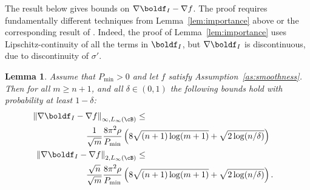 \documentclass[letterpaper, 10 pt, conference]{ieeeconf}  %
\newtheorem{lemma}{Lemma}
\begin{document}
The result below gives bounds on $\nabla\boldf_I-\nabla f$. The proof requires fundamentally different techniques from Lemma~\ref{lem:importance} above or the corresponding result of \cite{lamperski2024approximation}. Indeed, the proof of Lemma~\ref{lem:importance} uses Lipschitz-continuity of all the terms in $\boldf_I$, but $\nabla \boldf_I$ is discontinuous, due to discontinuity of $\sigma'$. 

\begin{lemma}
  \label{lem:gradApprox}
  {\it
    Assume that
    $P_{\min}>0$ and let $f$ satisfy Assumption~\ref{as:smoothness}. Then for all $m\ge n+1$, and all $\delta \in (0,1)$ the following bounds hold with probability at least $1-\delta$:
    \begin{align*}
      \left\| \nabla \boldf_I-\nabla f\right\|_{\infty,L_{\infty}(\cB)}\le \\
      &
        \hspace{-70pt}
 \frac{1}{\sqrt{m}}\frac{8\pi^2\rho}{P_{\min}}\left(8\sqrt{(n+1)\log(m+1)}+\sqrt{2\log(n/\delta)}\right)\\
      \left\| \nabla \boldf_I-\nabla f\right\|_{2,L_{\infty}(\cB)}\le \\
      &
        \hspace{-70pt}
        \frac{\sqrt{n}}{\sqrt{m}}
        \frac{8\pi^2\rho}{P_{\min}}
        \left(8\sqrt{(n+1)\log(m+1)}+\sqrt{2\log(n/\delta)}\right).
    \end{align*}
  }
\end{lemma}
\end{document}
